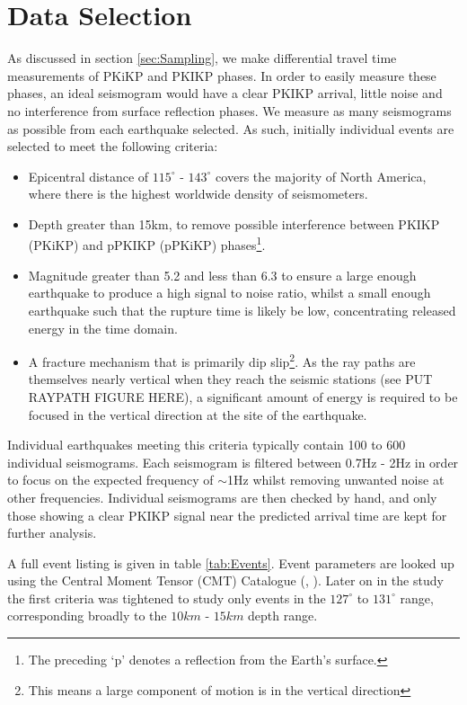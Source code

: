\documentclass[11pt,a4paper]{article}
\begin{document}
\section{Data Selection}
\label{sec:Data}
As discussed in section \ref{sec:Sampling}, we make differential travel time measurements of PKiKP and PKIKP phases. In order to easily measure these phases, an ideal seismogram would have a clear PKIKP arrival, little noise and no interference from surface reflection phases. We measure as many seismograms as possible from each earthquake selected. As such, initially individual events are selected to meet the following criteria:

\begin{itemize}
	\item Epicentral distance of $115^{\circ}$ - $143^{\circ}$ covers the majority of North America, where there is the highest worldwide density of seismometers.
	\item  Depth greater than 15km, to remove possible interference between PKIKP (PKiKP) and pPKIKP (pPKiKP) phases\footnote{The preceding `p' denotes a reflection from the Earth's surface.}.
	\item Magnitude greater than 5.2 and less than 6.3 to ensure a large enough earthquake to produce a high signal to noise ratio, whilst a small enough earthquake such that the rupture time is likely be low, concentrating released energy in the time domain.
	\item A fracture mechanism that is primarily dip slip\footnote{This means a large component of motion is in the vertical direction}. As the ray paths are themselves nearly vertical when they reach the seismic stations (see PUT RAYPATH FIGURE HERE), a significant amount of energy is required to be focused in the vertical direction at the site of the earthquake.
\end{itemize}

Individual earthquakes meeting this criteria typically contain 100 to 600 individual seismograms. Each seismogram is filtered between 0.7Hz - 2Hz in order to focus on the expected frequency of $\sim$1Hz whilst removing unwanted noise at other frequencies. Individual seismograms are then checked by hand, and only those showing a clear PKIKP signal near the predicted arrival time are kept for further analysis.

A full event listing is given in table \ref{tab:Events}. Event parameters are looked up using the Central Moment Tensor (CMT) Catalogue (\cite{Dziewonski1981}, \cite{Ekstrom2012}). Later on in the study the first criteria was tightened to study only events in the $127^{\circ}$ to $131^{\circ}$ range, corresponding broadly to the $10km$ - $15km$ depth range.
\end{document}
